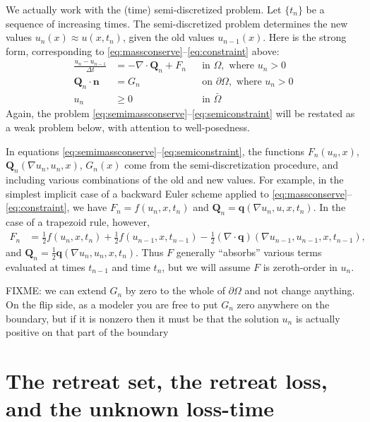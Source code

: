 \documentclass[final,leqno,onefignum,onetabnum]{siamltex1213bueler}
\newcommand\bn{\mathbf{n}}
\newcommand\bq{\mathbf{q}}
\newcommand\bQ{\mathbf{Q}}
\newcommand{\Div}{\nabla\cdot}
\renewcommand{\grad}{\nabla}
\begin{document}
We actually work with the (time) semi-discretized problem.  Let $\{t_n\}$ be a sequence of increasing times.  The semi-discretized problem determines the new values $u_n(x) \approx u(x,t_n)$, given the old values $u_{n-1}(x)$.  Here is the strong form, corresponding to \eqref{eq:massconserve}--\eqref{eq:constraint} above:
\begin{align}
\frac{u_n - u_{n-1}}{\Delta t} &= - \Div \bQ_n + F_n &&\text{in } \Omega, \text{ where } u_n > 0 \label{eq:semimassconserve} \\
\bQ_n \cdot \bn &= G_n &&\text{on } \partial\Omega, \text{ where } u_n > 0 \label{eq:semifixedneumann} \\
u_n &\ge 0 &&\text{in } \bar\Omega \label{eq:semiconstraint}
\end{align}
Again, the problem \eqref{eq:semimassconserve}--\eqref{eq:semiconstraint} will be restated as a weak problem below, with attention to well-posedness.

In equations  \eqref{eq:semimassconserve}--\eqref{eq:semiconstraint}, the functions $F_n(u_n,x)$, $\bQ_n(\grad u_n,u_n,x)$, $G_n(x)$ come from the semi-discretization procedure, and including various combinations of the old and new values.  For example, in the simplest implicit case of a backward Euler scheme applied to \eqref{eq:massconserve}--\eqref{eq:constraint}, we have $F_n = f(u_n,x,t_n)$ and $\bQ_n = \bq(\grad u_n,u,x,t_n)$.  In the case of a trapezoid rule, however,
\begin{align*}
F_n &= \frac{1}{2} f(u_n,x,t_n) + \frac{1}{2} f(u_{n-1},x,t_{n-1}) - \frac{1}{2} \left(\Div \bq\right)(\grad u_{n-1},u_{n-1},x,t_{n-1}),
\end{align*}
and $\bQ_n = \frac{1}{2} \bq(\grad u_n,u_n,x,t_n)$.  Thus $F$ generally ``absorbs'' various terms evaluated at times $t_{n-1}$ and time $t_n$, but we will assume $F$ is zeroth-order in $u_n$.

FIXME: we can extend $G_n$ by zero to the whole of $\partial \Omega$ and not change anything.  On the flip side, as a modeler you are free to put $G_n$ zero anywhere on the boundary, but if it is nonzero then it must be that the solution $u_n$ is actually positive on that part of the boundary


\section{The retreat set, the retreat loss, and the unknown loss-time}  \label{sec:retreatdefn}
\end{document}
